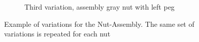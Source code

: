 \begin{figure}[hbt!]
\begin{subfigure}{0.2\textwidth}
        \caption{Third variation, assembly gray nut with left peg}
        \label{fig:third_variation_nut}
    \end{subfigure}
    \caption{Example of variations for the Nut-Assembly. The same set of variations is repeated for each nut}
    \label{fig:examples_of_variations_for_nut_assembly}
\end{figure}